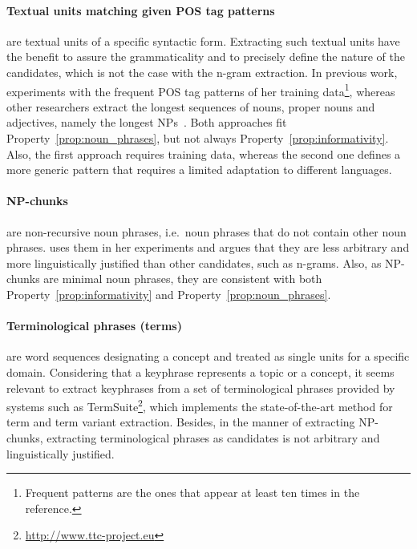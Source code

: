   \paragraph{Textual units matching given POS tag patterns} are textual units of
  a specific syntactic form. Extracting such textual units have the benefit to
  assure the grammaticality and to precisely define the nature of the
  candidates, which is not the case with the n-gram extraction. In previous
  work,  experiments with the frequent POS
  tag patterns of her training data\footnote{Frequent patterns are the ones that
  appear at least ten times in the reference.}, whereas other researchers
  extract the longest sequences of nouns, proper nouns and adjectives, namely
  the longest NPs~\cite{wan2008expandrank,hassan2010conundrums}. Both approaches
  fit Property~\ref{prop:noun_phrases}, but not always
  Property~\ref{prop:informativity}. Also, the first approach requires training
  data, whereas the second one defines a more generic pattern that requires a
  limited adaptation to different languages.

  \paragraph{NP-chunks} are non-recursive noun phrases, i.e.~noun phrases that
  do not contain other noun phrases.  uses
  them in her experiments and argues that they are less arbitrary and more
  linguistically justified than other candidates, such as n-grams. Also, as
  NP-chunks are minimal noun phrases, they are consistent with both
  Property~\ref{prop:informativity} and Property~\ref{prop:noun_phrases}.

  \paragraph{Terminological phrases (terms)} are word sequences designating a
  concept and treated as single units for a specific domain. Considering that a
  keyphrase represents a topic or a concept, it seems relevant to extract
  keyphrases from  a set of terminological phrases provided by systems such as
  TermSuite\footnote{\url{http://www.ttc-project.eu}}, which implements the
  state-of-the-art method for term and term variant extraction. Besides, in the
  manner of extracting NP-chunks, extracting terminological phrases as
  candidates is not arbitrary and linguistically justified.

